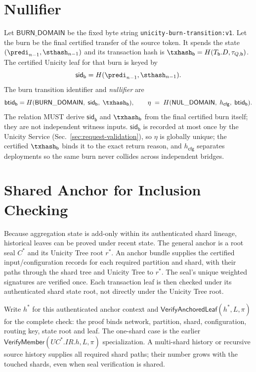 \section{Nullifier}\label{app:bridging-nullifier}

Let $\mathsf{BURN\_DOMAIN}$ be the fixed byte string \texttt{unicity-burn-transition:v1}. Let the burn be the final certified transfer of the source token. It spends the state $(\predi_{n-1},\sthash_{n-1})$ and its transaction hash is $\txhash_\mathsf{b}=H(T_\mathsf{b}.D,\tau_{Q,\mathsf b})$. The certified Unicity leaf for that burn is keyed by
\[
\mathsf{sid}_\mathsf{b} = H(\predi_{n-1},\sthash_{n-1}).
\]
The burn transition identifier and \emph{nullifier} are
\[
\mathsf{btid}_\mathsf{b} = H(\mathsf{BURN\_DOMAIN},\; \mathsf{sid}_\mathsf{b},\; \txhash_\mathsf{b}),
\qquad
\eta \;=\; H(\mathsf{NUL\_DOMAIN},\; h_\mathsf{cfg},\; \mathsf{btid}_\mathsf{b}).
\]
The relation MUST derive $\mathsf{sid}_\mathsf{b}$ and $\txhash_\mathsf{b}$ from the final certified burn itself; they are not independent witness inputs. $\mathsf{sid}_\mathsf{b}$ is recorded at most once by the Unicity Service (Sec.~\ref{sec:request-validation}), so $\eta$ is globally unique; the certified $\txhash_\mathsf{b}$ binds it to the exact return reason, and $h_\mathsf{cfg}$ separates deployments so the same burn never collides across independent bridges.

\section{Shared Anchor for Inclusion Checking}\label{app:bridging-anchor}

Because aggregation state is add-only within its authenticated shard lineage, historical leaves can be proved under recent state. The general anchor is a root seal $C^*$ and its Unicity Tree root $r^*$. An anchor bundle supplies the certified input/configuration records for each required partition and shard, with their paths through the shard tree and Unicity Tree to $r^*$. The seal's unique weighted signatures are verified once. Each transaction leaf is then checked under its authenticated shard state root, not directly under the Unicity Tree root.

Write $h^*$ for this authenticated anchor context and $\mathsf{VerifyAnchoredLeaf}(h^*,L,\pi)$ for the complete check: the proof binds network, partition, shard, configuration, routing key, state root and leaf. The one-shard case is the earlier $\mathsf{VerifyMember}(UC^*.IR.h,L,\pi)$ specialization. A multi-shard history or recursive source history supplies all required shard paths; their number grows with the touched shards, even when seal verification is shared.

